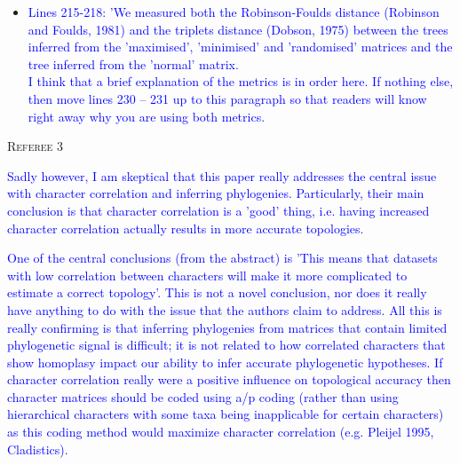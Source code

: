 \documentclass[12pt,letterpaper]{article}
\renewcommand{\section}[1]{%
\bigskip
\begin{center}
\begin{Large}
\normalfont\scshape #1
\medskip
\end{Large}
\end{center}}
\begin{document}
\begin{itemize}
\item{\textcolor{blue}{Lines 215-218: 'We measured both the Robinson-Foulds distance (Robinson and Foulds, 1981) and the triplets distance (Dobson, 1975) between the trees inferred from the 'maximised', 'minimised' and 'randomised' matrices and the tree inferred from the 'normal' matrix.
\\
I think that a brief explanation of the metrics is in order here. If nothing else, then move lines 230 – 231 up to this paragraph so that readers will know right away why you are using both metrics.}}
\end{itemize}



















\section{Referee 3}

\textcolor{blue}{Sadly however, I am skeptical that this paper really addresses the central issue with character correlation and inferring phylogenies. Particularly, their main conclusion is that character correlation is a 'good' thing, i.e. having increased character correlation actually results in more accurate topologies.} 

\textcolor{blue}{One of the central conclusions (from the abstract) is 'This means that datasets with low correlation between characters will make it more complicated to estimate a correct topology'. This is not a novel conclusion, nor does it really have anything to do with the issue that the authors claim to address. All this is really confirming is that inferring phylogenies from matrices that contain limited phylogenetic signal is difficult; it is not related to how correlated characters that show homoplasy impact our ability to infer accurate phylogenetic hypotheses. If character correlation really were a positive influence on topological accuracy then character matrices should be coded using a/p coding (rather than using hierarchical characters with some taxa being inapplicable for certain characters) as this coding method would maximize character correlation (e.g. Pleijel 1995, Cladistics).}
\end{document}
